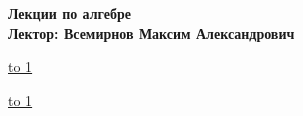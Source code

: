 \documentclass[12pt,a4paper]{article}
\begin{document}
\begin{center}
  {\Large \bf Лекции по алгебре} \\ 
  \vspace{0.5em}
  {\Large \bf Лектор: Всемирнов Максим Александрович} \\
\end{center}

\vspace{-1em}
\noindent \underline{\hbox to 1\textwidth{{ } \hfil{ } \hfil{ } }}

\vspace{1em}
\tableofcontents
\pagebreak











\noindent \underline{\hbox to 1\textwidth{{ } \hfil{ } \hfil{ } }}
\end{document}
